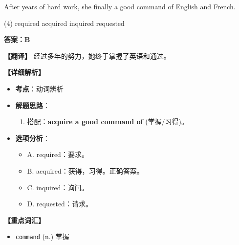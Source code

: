 \documentclass[11pt, a4paper]{article}
\newcommand{\analysis}[4]{
    \begin{solutionbox}
        \textbf{答案：#1}
        
        \textbf{【翻译】} #2
        
        \textbf{【详细解析】}
        #3
        
        \textbf{【重点词汇】}
        #4
    \end{solutionbox}
}
\newcommand{\blank}{\underline{\hspace{1.5cm}}}
\begin{document}
\begin{questions}
    \item After years of hard work, she finally \blank a good command of English and French.
    \begin{tasks}(4)
        \task required \task acquired \task inquired \task requested
    \end{tasks}
    \analysis{B}{经过多年的努力，她终于掌握了英语和通过。}{
        \begin{itemize}
            \item \textbf{考点}：动词辨析
            \item \textbf{解题思路}：
                \begin{enumerate}
                    \item 搭配：\textbf{acquire a good command of} (掌握/习得)。
                \end{enumerate}
            \item \textbf{选项分析}：
                \begin{itemize}
                    \item A. required：要求。
                    \item B. acquired：获得，习得。正确答案。
                    \item C. inquired：询问。
                    \item D. requested：请求。
                \end{itemize}
        \end{itemize}
    }{
        \begin{itemize}
            \item \texttt{command} (n.) 掌握
        \end{itemize}
    }


\end{questions}
\end{document}
